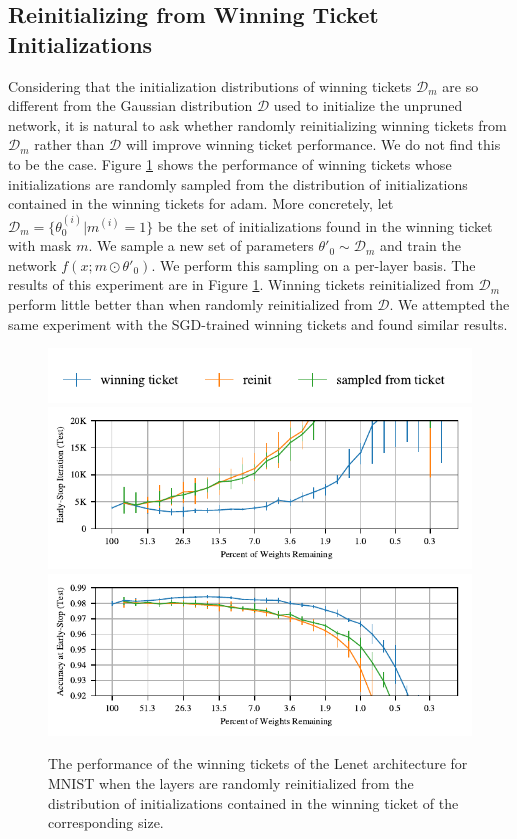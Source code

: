 \subsection{Reinitializing from Winning Ticket Initializations}
Considering that the initialization distributions of winning tickets $\mathcal{D}_m$ are so different from the Gaussian distribution $\mathcal{D}$ used to initialize the unpruned network,
it is natural to ask whether randomly reinitializing winning tickets from $\mathcal{D}_m$ rather than $\mathcal{D}$ will improve winning ticket performance.
We do not find this to be the case. Figure \ref{fig:sample-from-same-ticket} shows
the performance of winning tickets whose initializations are randomly sampled from the distribution of initializations contained in the winning tickets for adam.
More concretely, let
$\mathcal{D}_m = \{\theta_0^{(i)} | m^{(i)} = 1 \}$ be the set of initializations found in the winning ticket with mask $m$. We sample a new set of parameters
$\theta'_0 \sim \mathcal{D}_m$ and train the network $f(x; m \odot \theta'_0)$. We perform this sampling on a per-layer basis. The results of this experiment are in
Figure \ref{fig:sample-from-same-ticket}. Winning tickets reinitialized from $\mathcal{D}_m$ perform little better than when randomly reinitialized from $\mathcal{D}$.
We attempted the same experiment with the SGD-trained winning tickets and found similar results.


\begin{figure}
\centering
\includegraphics[width=.5\textwidth]{graphs/mnist/lenet/sample_from_same_ticket_vanilla/legend}
\includegraphics[width=.5\textwidth]{graphs/mnist/lenet/sample_from_same_ticket_vanilla/iteration}%
\includegraphics[width=.5\textwidth]{graphs/mnist/lenet/sample_from_same_ticket_vanilla/accuracy}
\caption{The performance of the winning tickets of the Lenet architecture for MNIST when the layers are randomly reinitialized from the distribution of
initializations contained in the winning ticket of the corresponding size.}
\label{fig:sample-from-same-ticket}
\end{figure}

